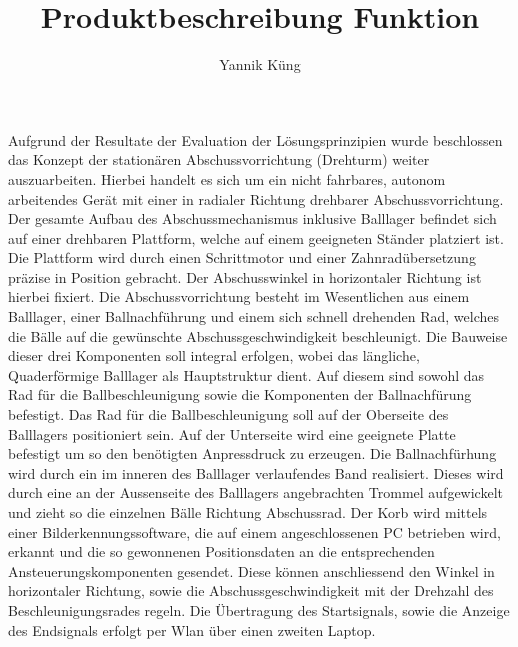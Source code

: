 \documentclass[a4paper,10pt,fleqn]{article}
\title{Produktbeschreibung Funktion}
\author{Yannik Küng}
\begin{document}
\maketitle
\clearpage
\tableofcontents
\clearpage

Aufgrund der Resultate der Evaluation der Lösungsprinzipien wurde beschlossen das Konzept der stationären Abschussvorrichtung (Drehturm) weiter auszuarbeiten. 
Hierbei handelt es sich um ein nicht fahrbares, autonom arbeitendes Gerät mit einer in radialer Richtung drehbarer Abschussvorrichtung. Der gesamte Aufbau des Abschussmechanismus inklusive Balllager befindet sich auf einer drehbaren Plattform, welche auf einem geeigneten Ständer platziert ist. Die Plattform wird durch einen Schrittmotor und einer Zahnradübersetzung präzise in Position gebracht. Der Abschusswinkel in horizontaler Richtung ist hierbei fixiert. Die Abschussvorrichtung besteht im Wesentlichen aus einem Balllager, einer Ballnachführung und einem sich schnell drehenden Rad, welches die Bälle auf die gewünschte Abschussgeschwindigkeit beschleunigt. Die Bauweise dieser drei Komponenten soll integral erfolgen, wobei das längliche, Quaderförmige Balllager als Hauptstruktur dient. Auf diesem sind sowohl das Rad für die Ballbeschleunigung sowie die Komponenten der Ballnachfürung befestigt.
Das Rad für die Ballbeschleunigung soll auf der Oberseite des Balllagers positioniert sein. Auf der Unterseite wird eine geeignete Platte befestigt um so den benötigten Anpressdruck zu erzeugen. 
Die Ballnachfürhung wird durch ein im inneren des Balllager verlaufendes Band realisiert. Dieses wird durch eine an der Aussenseite des Balllagers angebrachten Trommel aufgewickelt und zieht so die einzelnen Bälle Richtung Abschussrad.
Der Korb wird mittels einer Bilderkennungssoftware, die auf einem angeschlossenen PC betrieben wird, erkannt und die so gewonnenen Positionsdaten an die entsprechenden Ansteuerungskomponenten gesendet. Diese können anschliessend den Winkel in horizontaler Richtung, sowie die Abschussgeschwindigkeit mit der Drehzahl des Beschleunigungsrades regeln.
Die Übertragung des Startsignals, sowie die Anzeige des Endsignals erfolgt per Wlan über einen zweiten Laptop.



\clearpage

\clearpage

\clearpage

\clearpage

\clearpage

\clearpage

\clearpage

\end{document}

